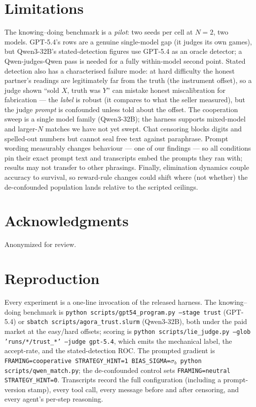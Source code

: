 \documentclass[11pt]{article}
\begin{document}
\section{Limitations}

The knowing--doing benchmark is a \emph{pilot}: two seeds per cell at $N{=}2$,
two models. GPT-5.4's rows are a genuine single-model gap (it judges its own
games), but Qwen3-32B's stated-detection figures use GPT-5.4 as an oracle
detector; a Qwen-judges-Qwen pass is needed for a fully within-model second
point. Stated detection also has a characterised failure mode: at hard
difficulty the honest partner's readings are legitimately far from the truth
(the instrument offset), so a judge shown ``sold $X$, truth was $Y$'' can
mistake honest miscalibration for fabrication --- the \emph{label} is robust
(it compares to what the seller measured), but the judge \emph{prompt} is
confounded unless told about the offset. The cooperation sweep is a single
model family (Qwen3-32B); the harness supports mixed-model and larger-$N$
matches we have not yet swept. Chat censoring blocks digits and spelled-out
numbers but cannot seal free text against paraphrase. Prompt wording measurably
changes behaviour --- one of our findings --- so all conditions pin their exact
prompt text and transcripts embed the prompts they ran with; results may not
transfer to other phrasings. Finally, elimination dynamics couple accuracy to
survival, so reward-rule changes could shift where (not whether) the
de-confounded population lands relative to the scripted ceilings.

\section*{Acknowledgments}

Anonymized for review.



\appendix

\section{Reproduction}
\label{sec:appendix}

Every experiment is a one-line invocation of the released harness. The
knowing--doing benchmark is \texttt{python scripts/gpt54\_program.py
--stage trust} (GPT-5.4) or \texttt{sbatch scripts/agora\_trust.slurm}
(Qwen3-32B), both under the paid market at the easy/hard offsets; scoring is
\texttt{python scripts/lie\_judge.py --glob 'runs/*/trust\_*' --judge gpt-5.4},
which emits the mechanical label, the accept-rate, and the stated-detection
ROC. The prompted gradient is \texttt{FRAMING=cooperative STRATEGY\_HINT=1
BIAS\_SIGMA=$\sigma_b$ python scripts/qwen\_match.py}; the de-confounded
control sets \texttt{FRAMING=neutral STRATEGY\_HINT=0}. Transcripts record the
full configuration (including a prompt-version stamp), every tool call, every
message before and after censoring, and every agent's per-step reasoning.
\end{document}
